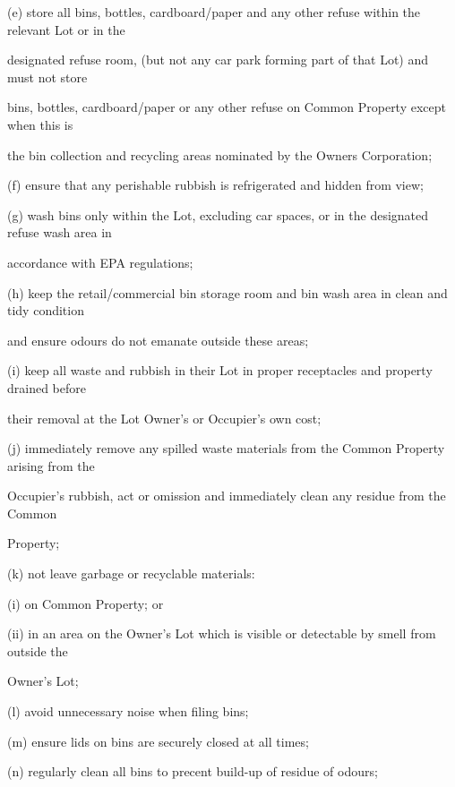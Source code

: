 \documentclass{article}
\begin{document}
{\fontsize{9.962}{1}(e) store all bins, bottles, cardboard/paper and any other refuse within the relevant Lot or in the }

{\fontsize{10.02}{1}designated refuse room, (but not any car park forming part of that Lot) and must not store }

{\fontsize{10.02}{1}bins, bottles, cardboard/paper or any other refuse on Common Property except when this is }

{\fontsize{10.02}{1}the bin collection and recycling areas nominated by the Owners Corporation; }

{\fontsize{9.962}{1}(f) ensure that any perishable rubbish is refrigerated and hidden from view; }

{\fontsize{9.962}{1}(g) wash bins only within the Lot, excluding car spaces, or in the designated refuse wash area in }

{\fontsize{10.02}{1}accordance with EPA regulations; }

{\fontsize{9.962}{1}(h) keep the retail/commercial bin storage room and bin wash area in clean and tidy condition }

{\fontsize{10.02}{1}and ensure odours do not emanate outside these areas; }

{\fontsize{9.962}{1}(i) keep all waste and rubbish in their Lot in proper receptacles and property drained before }

{\fontsize{10.02}{1}their removal at the Lot Owner’s or Occupier’s own cost; }

{\fontsize{9.962}{1}(j) immediately remove any spilled waste materials from the Common Property arising from the }

{\fontsize{10.02}{1}Occupier’s rubbish, act or omission and immediately clean any residue from the Common }

{\fontsize{10.02}{1}Property; }

{\fontsize{9.962}{1}(k) not leave garbage or recyclable materials: }

{\fontsize{9.962}{1}(i) on Common Property; or }

{\fontsize{9.962}{1}(ii) in an area on the Owner’s Lot which is visible or detectable by smell from outside the }

{\fontsize{10.02}{1}Owner’s Lot; }

{\fontsize{9.962}{1}(l) avoid unnecessary noise when filing bins; }

{\fontsize{9.962}{1}(m) ensure lids on bins are securely closed at all times; }

{\fontsize{9.962}{1}(n) regularly clean all bins to precent build-up of residue of odours; }
\end{document}
